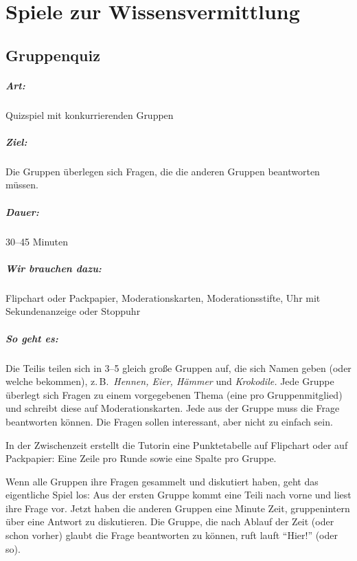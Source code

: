 \chapter{Spiele zur Wissensvermittlung}

\section{Gruppenquiz}
\paragraph{Art:} Quizspiel mit konkurrierenden Gruppen
\paragraph{Ziel:} Die Gruppen überlegen sich Fragen, die die anderen Gruppen beantworten müssen.
\paragraph{Dauer:} 30--45 Minuten
\paragraph{Wir brauchen dazu:} Flipchart oder Packpapier, Moderationskarten, Moderationsstifte, Uhr mit Sekundenanzeige oder Stoppuhr
\paragraph{So geht es:} Die Teilis teilen sich in 3--5 gleich große Gruppen auf, die sich Namen geben (oder welche bekommen), z.\,B.~\emph{Hennen, Eier, Hämmer} und \emph{Krokodile.} Jede Gruppe überlegt sich Fragen zu einem vorgegebenen Thema (eine pro Gruppenmitglied) und schreibt diese auf Moderationskarten. Jede aus der Gruppe muss die Frage beantworten können. Die Fragen sollen interessant, aber nicht zu einfach sein.

In der Zwischenzeit erstellt die Tutorin eine Punktetabelle auf Flipchart oder auf Packpapier: Eine Zeile pro Runde sowie eine Spalte pro Gruppe.

Wenn alle Gruppen ihre Fragen gesammelt und diskutiert haben, geht das eigentliche Spiel los: Aus der ersten Gruppe kommt eine Teili nach vorne und liest ihre Frage vor. Jetzt haben die anderen Gruppen eine Minute Zeit, gruppenintern über eine Antwort zu diskutieren. Die Gruppe, die nach Ablauf der Zeit (oder schon vorher) glaubt die Frage beantworten zu können, ruft lauft "`Hier!"' (oder so).

